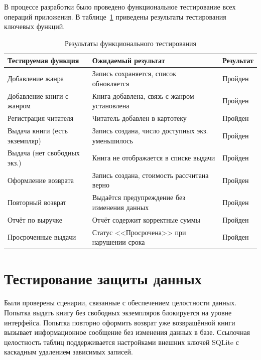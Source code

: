 \documentclass[14pt]{extreport}
\begin{document}
	В процессе разработки было проведено функциональное тестирование всех операций приложения. В таблице~\ref{tab:testing} приведены результаты тестирования ключевых функций.
	
	\begin{table}[H]
		\caption{Результаты функционального тестирования}
		\label{tab:testing}
		\begin{tabular}{|p{5.5cm}|p{5cm}|p{2.5cm}|}
			\hline
			\textbf{Тестируемая \newline функция} & \textbf{Ожидаемый \newline результат} & \textbf{Результат} \\
			\hline
			Добавление жанра & Запись сохраняется, список обновляется & Пройден \\
			\hline
			Добавление книги с жанром & Книга добавлена, связь с жанром установлена & Пройден \\
			\hline
			Регистрация читателя & Читатель добавлен в картотеку & Пройден \\
			\hline
			Выдача книги (есть экземпляр) & Запись создана, число доступных экз. уменьшилось & Пройден \\
			\hline
			Выдача (нет свободных экз.) & Книга не отображается в списке выдачи & Пройден \\
			\hline
			Оформление возврата & Запись создана, стоимость рассчитана верно & Пройден \\
			\hline
			Повторный возврат & Выдаётся предупреждение без изменения данных & Пройден \\
			\hline
			Отчёт по выручке & Отчёт содержит корректные суммы & Пройден \\
			\hline
			Просроченные выдачи & Статус <<Просрочена>> при нарушении срока & Пройден \\
			\hline
		\end{tabular}
	\end{table}
	
	\section{Тестирование защиты данных}
	
	Были проверены сценарии, связанные с обеспечением целостности данных. Попытка выдать книгу без свободных экземпляров блокируется на уровне интерфейса. Попытка повторно оформить возврат уже возвращённой книги вызывает информационное сообщение без изменения данных в базе. Ссылочная целостность таблиц поддерживается настройками внешних ключей SQLite с каскадным удалением зависимых записей.
	
\end{document}
